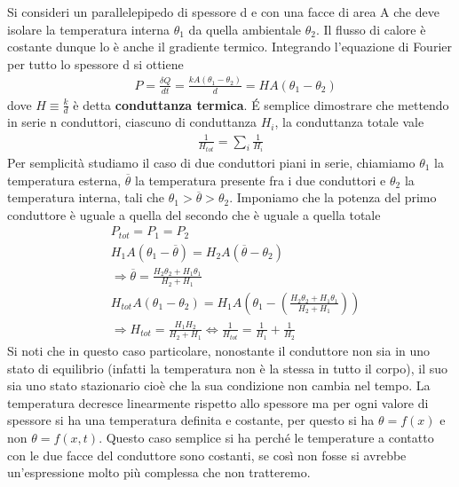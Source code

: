 \documentclass[
10pt, %
a4paper, %
oneside, %
headinclude,footinclude, %
BCOR5mm, %
]{scrartcl}
\begin{document}
\begin{exercise}
	Si consideri un parallelepipedo di spessore d e con una facce di area A che deve isolare la temperatura interna $\theta_1$ da quella ambientale $\theta_2$. Il flusso di calore è costante dunque lo è anche il gradiente termico. Integrando l'equazione di Fourier per tutto lo spessore d si ottiene 
	\begin{align*}
		&P = \frac{\delta Q}{dt} = \frac{k A (\theta_1 - \theta_2)}{d}= H A (\theta_1 - \theta_2)
	\end{align*}
	dove \(H\equiv \frac{k}{d}\) è detta \textbf{conduttanza termica}. \'{E} semplice dimostrare che mettendo in serie n conduttori, ciascuno di conduttanza $H_i$, la conduttanza totale vale
	\begin{align*}
		\frac{1}{H_{tot}} = \sum_i \frac{1}{H_i}
	\end{align*}
	Per semplicità studiamo il caso di due conduttori piani in serie, chiamiamo $\theta_1$ la temperatura esterna, $\overline{\theta}$ la temperatura presente fra i due conduttori e $\theta_2$ la temperatura interna, tali che \(\theta_1>\overline{\theta}>\theta_2\). Imponiamo che la potenza del primo conduttore è uguale a quella del secondo che è uguale a quella totale
	\begin{align*}
		&P_{tot} = P_1 = P_2\\
		&H_1 A (\theta_1 - \overline{\theta}) = H_2 A (\overline{\theta}-\theta_2)\\
		&\Rightarrow \overline{\theta} = \frac{H_2\theta_2 + H_1\theta_1}{H_2 + H_1}\\
		&H_{tot} A (\theta_1 - \theta_2) = H_1 A \left(\theta_1 - \left(\frac{H_2\theta_2 + H_1\theta_1}{H_2 + H_1}\right)\right)\\
		&\Rightarrow H_{tot} = \frac{H_1 H_2}{H_2 + H_1} \Leftrightarrow \frac{1}{H_{tot}} = \frac{1}{H_1}+\frac{1}{H_2}
	\end{align*}
	Si noti che in questo caso particolare, nonostante il conduttore non sia in uno stato di equilibrio (infatti la temperatura non è la stessa in tutto il corpo), il suo sia uno stato stazionario cioè che la sua condizione non cambia nel tempo. La temperatura decresce linearmente rispetto allo spessore ma per ogni valore di spessore si ha una temperatura definita e costante, per questo si ha $\theta = f(x)$ e non $\theta= f(x, t)$. Questo caso semplice si ha perché le temperature a contatto con le due facce del conduttore sono costanti, se così non fosse si avrebbe un'espressione molto più complessa che non tratteremo. 
\end{exercise}
\end{document}
